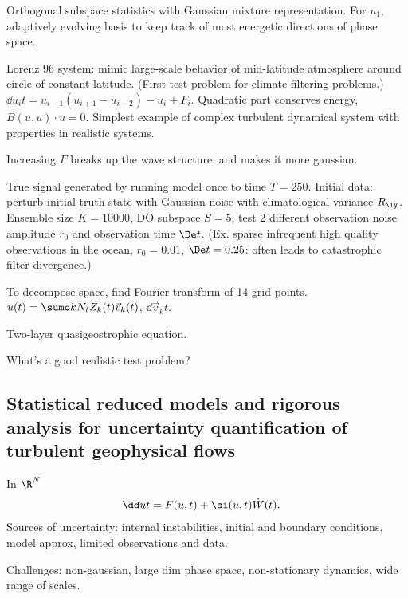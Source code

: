 Orthogonal subspace statistics with Gaussian mixture representation.
For $u_1$, adaptively evolving basis to keep track of most energetic directions of phase space.

Lorenz 96 system: mimic large-scale behavior of mid-latitude atmosphere around circle of constant latitude. (First test problem for climate filtering problems.) 
$\dd{u_i}t = u_{i-1}(u_{i+1}-u_{i-2})-u_i+F_i$. Quadratic part conserves energy, $B(u,u)\cdot u=0$. Simplest example of complex turbulent dynamical system with properties in realistic systems.

Increasing $F$ breaks up the wave structure, and makes it more gaussian.

True signal generated by running model once to time $T=250$. Initial data: perturb initial truth state with Gaussian noise with climatological variance $R_\iy$.  Ensemble size $K=10000$, DO subspace $S=5$, test 2 different observation noise amplitude $r_0$ and observation time $\De t$. (Ex. sparse infrequent high quality observations in the ocean, $r_0=0.01$, $\De t=0.25$: often leads to catastrophic filter divergence.)

To decompose space, find Fourier transform of 14 grid points. $u(t) = \sumo k{N_t} Z_k(t)\vec v_k(t)$, $\dd{\vec v_k}t$.

Two-layer quasigeostrophic equation.


What's a good realistic test problem?

\subsection{Statistical reduced models and rigorous analysis for uncertainty quantification of turbulent geophysical flows}

In $\R^N$
\begin{align}
\dd ut &= F(u,t) + \si(u,t)\dot W(t).
\end{align}
Sources of uncertainty: internal instabilities, initial and boundary conditions, model approx, limited observations and data.

Challenges: non-gaussian, large dim phase space, non-stationary dynamics, wide range of scales.

